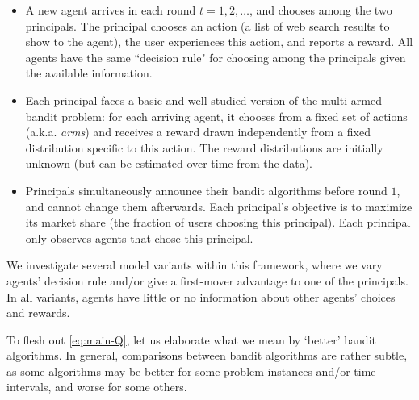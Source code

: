 \begin{itemize}

\item A new agent arrives in each round $t=1,2, \ldots$, and chooses among the two principals. The principal chooses an action (\eg a list of web search results to show to the agent), the user experiences this action, and reports a reward. All agents have the same ``decision rule" for choosing among the principals given the available information.

\item Each principal faces a basic and well-studied version of the multi-armed bandit problem: for each arriving agent, it chooses from a fixed set of actions  (a.k.a. \emph{arms}) and receives a reward drawn independently from a fixed distribution specific to this action. The reward distributions are initially unknown (but can be estimated over time from the data).

\item Principals simultaneously announce their bandit algorithms before round $1$, and cannot change them afterwards.  Each principal's objective is to maximize its market share (the fraction of users choosing this principal). Each principal only observes agents that chose this principal. 
\end{itemize}

\noindent We investigate several model variants within this framework, where we vary agents' decision rule and/or give a first-mover advantage to one of the principals. In all variants, agents have little or no information about other agents' choices and rewards.


To flesh out \eqref{eq:main-Q}, let us elaborate what we mean by `better' bandit algorithms. In general, comparisons between bandit algorithms are rather subtle, as some algorithms may be better for some problem instances and/or time intervals, and worse for some others.

